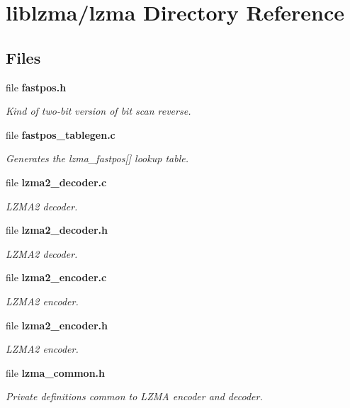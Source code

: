 \section{liblzma/lzma Directory Reference}
\label{dir_ac7229a575da173bd8a390f0921c5810}
\subsection*{Files}
\begin{DoxyCompactItemize}
\item 
file \textbf{ fastpos.\+h}
\begin{DoxyCompactList}\small\item\em Kind of two-\/bit version of bit scan reverse. \end{DoxyCompactList}\item 
file \textbf{ fastpos\+\_\+tablegen.\+c}
\begin{DoxyCompactList}\small\item\em Generates the lzma\+\_\+fastpos[] lookup table. \end{DoxyCompactList}\item 
file \textbf{ lzma2\+\_\+decoder.\+c}
\begin{DoxyCompactList}\small\item\em L\+Z\+M\+A2 decoder. \end{DoxyCompactList}\item 
file \textbf{ lzma2\+\_\+decoder.\+h}
\begin{DoxyCompactList}\small\item\em L\+Z\+M\+A2 decoder. \end{DoxyCompactList}\item 
file \textbf{ lzma2\+\_\+encoder.\+c}
\begin{DoxyCompactList}\small\item\em L\+Z\+M\+A2 encoder. \end{DoxyCompactList}\item 
file \textbf{ lzma2\+\_\+encoder.\+h}
\begin{DoxyCompactList}\small\item\em L\+Z\+M\+A2 encoder. \end{DoxyCompactList}\item 
file \textbf{ lzma\+\_\+common.\+h}
\begin{DoxyCompactList}\small\item\em Private definitions common to L\+Z\+MA encoder and decoder. \end{DoxyCompactList}\item 

\end{DoxyCompactItemize}
